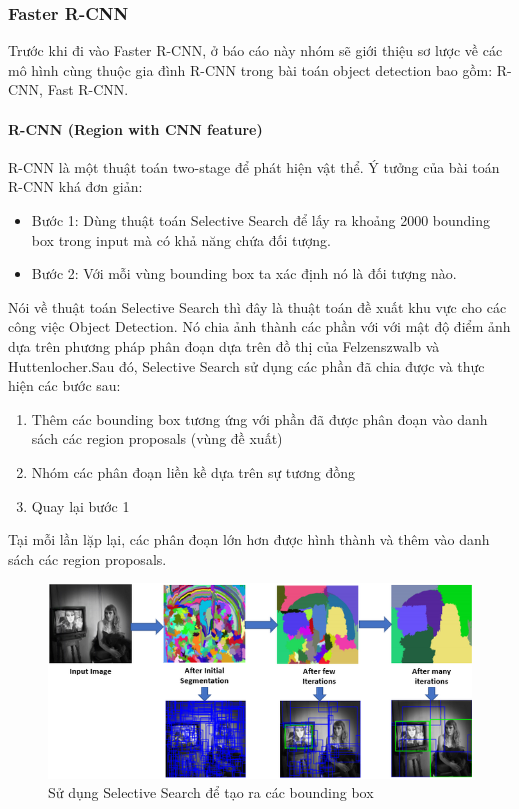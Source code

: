 \subsubsection{Faster R-CNN}
Trước khi đi vào Faster R-CNN, ở báo cáo này nhóm sẽ giới thiệu sơ lược về các mô hình cùng thuộc gia đình R-CNN trong bài toán object detection bao gồm: R-CNN, Fast R-CNN.

\paragraph{R-CNN (Region with CNN feature)\\}

R-CNN \cite{rcnn} là một thuật toán two-stage để phát hiện vật thể. Ý tưởng của bài toán R-CNN khá đơn giản:
\begin{itemize}[noitemsep, topsep=0pt, leftmargin=1.25em, label={$-$}]
    \item Bước 1: Dùng thuật toán Selective Search để lấy ra khoảng 2000 bounding box trong input mà có khả năng chứa đối tượng.
    \item Bước 2: Với mỗi vùng bounding box ta xác định nó là đối tượng nào.
\end{itemize}

Nói về thuật toán Selective Search thì đây là thuật toán đề xuất khu vực cho các công việc Object Detection. Nó chia ảnh thành các phần với với mật độ điểm ảnh dựa trên phương pháp phân đoạn dựa trên đồ thị của Felzenszwalb và Huttenlocher.Sau đó, Selective Search sử dụng các phần đã chia được và thực hiện các bước sau:
\begin{enumerate}[topsep=0pt,itemsep=-1ex,partopsep=1ex,parsep=1ex]
    \item Thêm các bounding box tương ứng với phần đã được phân đoạn vào danh sách các region proposals (vùng đề xuất)
    \item Nhóm các phân đoạn liền kề dựa trên sự tương đồng
    \item Quay lại bước 1
\end{enumerate}

Tại mỗi lần lặp lại, các phân đoạn lớn hơn được hình thành và thêm vào danh sách các region proposals.

\begin{figure}[h!]
  \centering
  \includegraphics[scale=0.58]{graphics/selective search.png}
  \caption{Sử dụng Selective Search để tạo ra các bounding box}
\end{figure}

